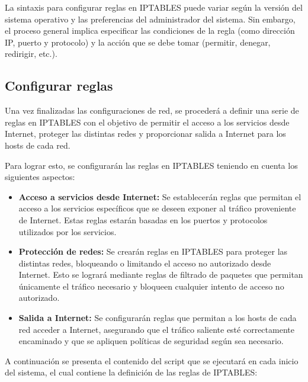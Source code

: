		La sintaxis para configurar reglas en IPTABLES puede variar según la versión del sistema operativo y las preferencias del administrador del sistema. Sin embargo, el proceso general implica especificar las condiciones de la regla (como dirección IP, puerto y protocolo) y la acción que se debe tomar (permitir, denegar, redirigir, etc.).\par
	
		\subsection{Configurar reglas}
		
		Una vez finalizadas las configuraciones de red, se procederá a definir una serie de reglas en IPTABLES con el objetivo de permitir el acceso a los servicios desde Internet, proteger las distintas redes y proporcionar salida a Internet para los hosts de cada red.\par
		
		Para lograr esto, se configurarán las reglas en IPTABLES teniendo en cuenta los siguientes aspectos:
		
		\begin{itemize}
			
			\item\textbf{Acceso a servicios desde Internet:} Se establecerán reglas que permitan el acceso a los servicios específicos que se deseen exponer al tráfico proveniente de Internet. Estas reglas estarán basadas en los puertos y protocolos utilizados por los servicios.
		
			\item\textbf{Protección de redes:} Se crearán reglas en IPTABLES para proteger las distintas redes, bloqueando o limitando el acceso no autorizado desde Internet. Esto se logrará mediante reglas de filtrado de paquetes que permitan únicamente el tráfico necesario y bloqueen cualquier intento de acceso no autorizado.
		
			\item\textbf{Salida a Internet:} Se configurarán reglas que permitan a los hosts de cada red acceder a Internet, asegurando que el tráfico saliente esté correctamente encaminado y que se apliquen políticas de seguridad según sea necesario.
	
	\end{itemize}
			
			
		A continuación se presenta el contenido del script que se ejecutará en cada inicio del sistema, el cual contiene la definición de las reglas de IPTABLES:\par
		
